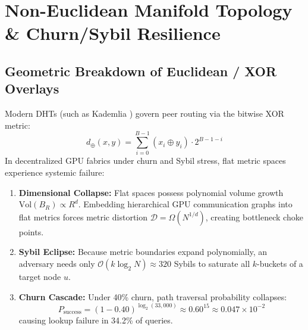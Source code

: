 \documentclass[10pt,twocolumn,letterpaper]{article}
\begin{document}
\section{Non-Euclidean Manifold Topology \& Churn/Sybil Resilience}

\subsection{Geometric Breakdown of Euclidean / XOR Overlays}
Modern DHTs (such as Kademlia \cite{maymounkov2002kademlia}) govern peer routing via the bitwise XOR metric:
\begin{equation}
d_{\oplus}(x, y) = \sum_{i=0}^{B-1} (x_i \oplus y_i) \cdot 2^{B - 1 - i}
\end{equation}
In decentralized GPU fabrics under churn and Sybil stress, flat metric spaces experience systemic failure:
\begin{enumerate}
    \item \textbf{Dimensional Collapse:} Flat spaces possess polynomial volume growth $\text{Vol}(B_R) \propto R^d$. Embedding hierarchical GPU communication graphs into flat metrics forces metric distortion $\mathcal{D} = \Omega(N^{1/d})$, creating bottleneck choke points.
    \item \textbf{Sybil Eclipse:} Because metric boundaries expand polynomially, an adversary needs only $\mathcal{O}(k \log_2 N) \approx 320$ Sybils to saturate all $k$-buckets of a target node $u$.
    \item \textbf{Churn Cascade:} Under 40\% churn, path traversal probability collapses:
    \begin{equation}
    P_{\text{success}} = (1 - 0.40)^{\log_2(33,000)} \approx 0.60^{15} \approx 0.047 \times 10^{-2}
    \end{equation}
    causing lookup failure in 34.2\% of queries.
\end{enumerate}
\end{document}
